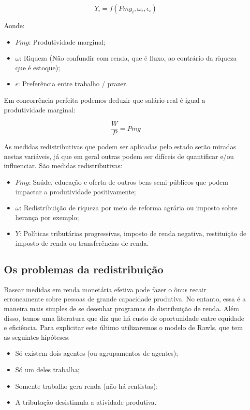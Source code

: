 \documentclass[12pt,a4paper,oneside,brazil]{abntex2}
\begin{document}
\[ Y_i = f(Pmg_i, \omega_i, \epsilon_i) \] 

Aonde:
\begin{itemize}
\item $Pmg$: Produtividade marginal;
\item $\omega$: Riqueza (Não confundir com renda, que é fluxo, ao contrário da riqueza que é estoque);
\item $\epsilon$: Preferência entre trabalho / prazer.
\end{itemize}

Em concorrência perfeita podemos deduzir que salário real é igual a produtividade marginal:

\[ \frac{W}{P} = Pmg\]

As medidas redistributivas que podem ser aplicadas pelo estado serão miradas nestas variáveis, já que em geral outras podem ser difíceis de quantificar e/ou influenciar. São medidas redistributivas:

\begin{itemize}
\item $Pmg$: Saúde, educação e oferta de outros bens semi-públicos que podem impactar a produtividade positivamente;
\item $\omega$: Redistribuição de riqueza por meio de reforma agrária ou imposto sobre herança por exemplo;
\item $Y$: Políticas tributárias progressivas, imposto de renda negativa, restituição de imposto de renda ou transferências de renda.
\end{itemize}

\subsection{Os problemas da redistribuição}

Basear medidas em renda monetária efetiva pode fazer o ônus recair erroneamente sobre pessoas de grande capacidade produtiva. No entanto, essa é a maneira mais simples de se desenhar programas de distribuição de renda. Além disso, temos uma literatura que diz que há custo de oportunidade entre equidade e eficiência. Para explicitar este último utilizaremos o modelo de Rawls, que tem as seguintes hipóteses:

\begin{itemize}
\item Só existem dois agentes (ou agrupamentos de agentes);
\item Só um deles trabalha;
\item Somente trabalho gera renda (não há rentistas);
\item A tributação desistimula a atividade produtiva.
\end{itemize}
\end{document}
